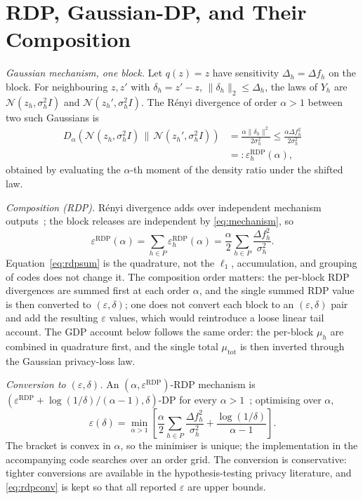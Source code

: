 \documentclass[10pt,twocolumn,letterpaper]{article}
\providecommand{\RDP}{\mathrm{RDP}}
\theoremstyle{plain}
\theoremstyle{definition}
\begin{document}
\section{RDP, Gaussian-DP, and Their Composition}
\label{sec:rdpgdp}

\emph{Gaussian mechanism, one block.} Let $q(z)=z$ have sensitivity
$\Delta_h=\Delta f_h$ on the block. For neighbouring $z,z'$ with
$\delta_h=z'-z$, $\|\delta_h\|_2\le\Delta_h$, the laws of $Y_h$ are
$\mathcal{N}(z_h,\sigma_h^2I)$ and $\mathcal{N}(z_h',\sigma_h^2I)$. The
Rényi divergence of order $\alpha>1$ between two such Gaussians is
\begin{equation}
\begin{aligned}
D_\alpha\!\left(\mathcal{N}(z_h,\sigma_h^2I)\,\|\,
\mathcal{N}(z_h',\sigma_h^2 I)\right)
&=\frac{\alpha\|\delta_h\|^2}{2\sigma_h^2}
\le\frac{\alpha\Delta f_h^{2}}{2\sigma_h^{2}}\\
&=:\varepsilon_h^{\RDP}(\alpha),
\end{aligned}
\label{eq:rdpblock}
\end{equation}
obtained by evaluating the $\alpha$-th moment of the density ratio under the
shifted law.

\emph{Composition (RDP).} Rényi divergence adds over independent mechanism
outputs~\cite{mironov2017rdp}; the block releases are independent by
\eqref{eq:mechanism}, so
\begin{equation}
\varepsilon^{\RDP}(\alpha)=\sum_{h\in P}\varepsilon_h^{\RDP}(\alpha)
=\frac{\alpha}{2}\sum_{h\in P}\frac{\Delta f_h^{2}}{\sigma_h^{2}}.
\label{eq:rdpsum}
\end{equation}
Equation~\eqref{eq:rdpsum} is the quadrature, not the $\ell_1$, accumulation,
and grouping of codes does not change it. The composition order matters: the
per-block RDP divergences are summed first at each order $\alpha$, and the
single summed RDP value is then converted to $(\varepsilon,\delta)$; one does
not convert each block to an $(\varepsilon,\delta)$ pair and add the resulting
$\varepsilon$ values, which would reintroduce a loose linear tail account. The
GDP account below follows the same order: the per-block $\mu_h$ are combined in
quadrature first, and the single total $\mu_{\mathrm{tot}}$ is then inverted
through the Gaussian privacy-loss law.

\emph{Conversion to $(\varepsilon,\delta)$.} An
$(\alpha,\varepsilon^{\RDP})$-RDP mechanism is
$(\varepsilon^{\RDP}+\log(1/\delta)/(\alpha-1),\delta)$-DP for every
$\alpha>1$~\cite{mironov2017rdp}; optimising over $\alpha$,
\begin{equation}
\varepsilon(\delta)=\min_{\alpha>1}\left[
\frac{\alpha}{2}\sum_{h\in P}\frac{\Delta f_h^{2}}{\sigma_h^{2}}
+\frac{\log(1/\delta)}{\alpha-1}\right].
\label{eq:rdpconv}
\end{equation}
The bracket is convex in $\alpha$, so the minimiser is unique; the
implementation in the accompanying code searches over an order grid. The
conversion is conservative: tighter conversions are available in the
hypothesis-testing privacy literature, and \eqref{eq:rdpconv} is kept so that
all reported $\varepsilon$ are upper bounds.
\end{document}
